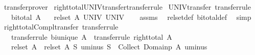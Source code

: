 \begin{isabellebody}
\ transfer{\isacharunderscore}{\kern0pt}prover%
\endisatagproof
{\isafoldproof}%
%
\isadelimproof
\isanewline
%
\endisadelimproof
\isanewline
{}\isamarkupfalse%
\isanewline
\isanewline
{}\isamarkupfalse%
\ right{\isacharunderscore}{\kern0pt}total{\isacharunderscore}{\kern0pt}UNIV{\isacharunderscore}{\kern0pt}transfer{\isacharbrackleft}{\kern0pt}transfer{\isacharunderscore}{\kern0pt}rule{\isacharbrackright}{\kern0pt}\isanewline
\isanewline
{}\isamarkupfalse%
\ UNIV{\isacharunderscore}{\kern0pt}transfer\ {\isacharbrackleft}{\kern0pt}transfer{\isacharunderscore}{\kern0pt}rule{\isacharbrackright}{\kern0pt}{\isacharcolon}{\kern0pt}\isanewline
\ \ \ {\isachardoublequoteopen}bi{\isacharunderscore}{\kern0pt}total\ A{\isachardoublequoteclose}\isanewline
\ \ \ {\isachardoublequoteopen}{\isacharparenleft}{\kern0pt}rel{\isacharunderscore}{\kern0pt}set\ A{\isacharparenright}{\kern0pt}\ UNIV\ UNIV{\isachardoublequoteclose}\isanewline
%
\isadelimproof
\ \ %
\endisadelimproof
%
\isatagproof
{}\isamarkupfalse%
\ assms\ \isamarkupfalse%
\ rel{\isacharunderscore}{\kern0pt}set{\isacharunderscore}{\kern0pt}def\ bi{\isacharunderscore}{\kern0pt}total{\isacharunderscore}{\kern0pt}def\ \isamarkupfalse%
\ simp%
\endisatagproof
{\isafoldproof}%
%
\isadelimproof
\isanewline
%
\endisadelimproof
\isanewline
{}\isamarkupfalse%
\ right{\isacharunderscore}{\kern0pt}total{\isacharunderscore}{\kern0pt}Compl{\isacharunderscore}{\kern0pt}transfer\ {\isacharbrackleft}{\kern0pt}transfer{\isacharunderscore}{\kern0pt}rule{\isacharbrackright}{\kern0pt}{\isacharcolon}{\kern0pt}\isanewline
\ \ \ {\isacharbrackleft}{\kern0pt}transfer{\isacharunderscore}{\kern0pt}rule{\isacharbrackright}{\kern0pt}{\isacharcolon}{\kern0pt}\ {\isachardoublequoteopen}bi{\isacharunderscore}{\kern0pt}unique\ A{\isachardoublequoteclose}\ \ {\isacharbrackleft}{\kern0pt}transfer{\isacharunderscore}{\kern0pt}rule{\isacharbrackright}{\kern0pt}{\isacharcolon}{\kern0pt}\ {\isachardoublequoteopen}right{\isacharunderscore}{\kern0pt}total\ A{\isachardoublequoteclose}\isanewline
\ \ \ {\isachardoublequoteopen}{\isacharparenleft}{\kern0pt}rel{\isacharunderscore}{\kern0pt}set\ A\ {\isacharequal}{\kern0pt}{\isacharequal}{\kern0pt}{\isacharequal}{\kern0pt}{\isachargreater}{\kern0pt}\ rel{\isacharunderscore}{\kern0pt}set\ A{\isacharparenright}{\kern0pt}\ {\isacharparenleft}{\kern0pt}{\isasymlambda}S{\isachardot}{\kern0pt}\ uminus\ S\ {\isasyminter}\ Collect\ {\isacharparenleft}{\kern0pt}Domainp\ A{\isacharparenright}{\kern0pt}{\isacharparenright}{\kern0pt}\ uminus{\isachardoublequoteclose}\isanewline

\end{isabellebody}
